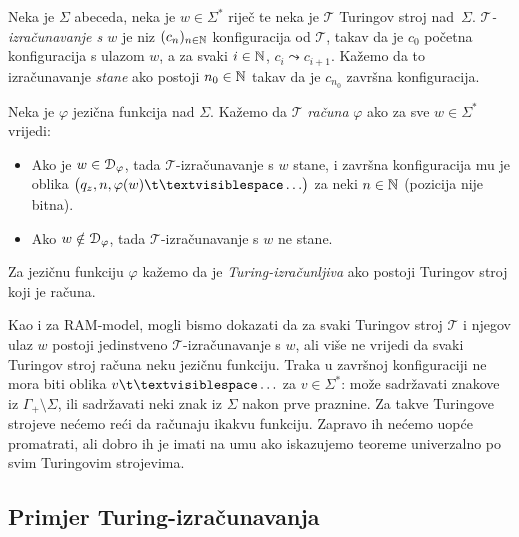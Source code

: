 \begin{definicija}[{name=[Turing-izračunljiva jezična funkcija]}]\label{def:Tcomputefi}
Neka je $\Sigma$ abeceda, neka je $w\in\Sigma^*$ riječ te neka je $\mathcal T$ Turingov stroj nad~$\Sigma$. \emph{$\mathcal T$\!-izračunavanje s $w$} je niz $(c_n)_{n\in{\mathbb N}}$ konfiguracija od $\mathcal T$, takav da je $c_0$ početna konfiguracija s ulazom $w$, a za svaki $i\in{\mathbb N}$, $c_i\leadsto c_{i+1}$. Kažemo da to izračunavanje \emph{stane} ako postoji $n_0\in{\mathbb N}$ takav da je $c_{n_0}$ završna konfiguracija.

Neka je $\varphi$ jezična funkcija nad $\Sigma$. Kažemo da $\mathcal T$ \emph{računa} $\varphi$ ako za sve $w\in\Sigma^*$ vrijedi:
\begin{itemize}
    \item Ako je $w\in\mathcal D_{\varphi}$, tada $\mathcal T$-izračunavanje s $w$ stane, i završna konfiguracija mu je oblika $\bigl(q_z,n,\varphi(w)\bl\ldots\bigr)$ za neki $n\in{\mathbb N}$ (pozicija nije bitna).
    \item Ako $w\notin\mathcal D_{\varphi}$, tada $\mathcal T$-izračunavanje s $w$ ne stane.
\end{itemize}
Za jezičnu funkciju $\varphi$ kažemo da je \emph{Turing-izračunljiva} ako postoji Turingov stroj koji je računa.
\end{definicija}

Kao i za RAM-model, mogli bismo dokazati da za svaki Turingov stroj $\mathcal T$ i njegov ulaz $w$ postoji jedinstveno $\mathcal T$-izračunavanje s $w$, ali više ne vrijedi da svaki Turingov stroj računa neku jezičnu funkciju. Traka u završnoj konfiguraciji ne mora biti oblika $v\bl\ldots$ za $v\in\Sigma^*$: može sadržavati znakove iz $\Gamma_+\!\setminus\Sigma$, ili sadržavati neki znak iz $\Sigma$ nakon prve praznine. Za takve Turingove strojeve nećemo reći da računaju ikakvu funkciju. Zapravo ih nećemo uopće promatrati, ali dobro ih je imati na umu ako iskazujemo teoreme univerzalno po svim Turingovim strojevima.

\subsection{Primjer Turing-izračunavanja}

